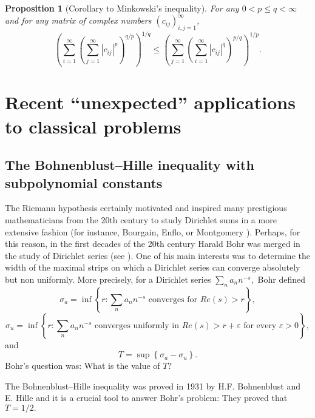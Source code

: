 \documentclass[10pt]{amsart}
\newtheorem{proposition}[theorem]{Proposition}
\numberwithin{equation}{section}
\begin{document}
\begin{proposition}[Corollary to Minkowski's inequality]
\label{8776}For any $0<p\leq q< \infty $ and for any matrix of complex
numbers $(c_{ij})_{i,j=1}^{\infty}$,
\begin{equation*}
\left( \sum_{i=1}^{\infty}\left( \sum_{j=1}^{\infty}|c_{ij}|^{p}\right)
^{q/p}\right) ^{1/q}\leq \left( \sum_{j=1}^{\infty}\left(
\sum_{i=1}^{\infty}|c_{ij}|^{q}\right) ^{p/q}\right) ^{1/p}.
\end{equation*}
\end{proposition}

\section{Recent ``unexpected'' applications to classical problems}

\subsection{The Bohnenblust--Hille inequality with subpolynomial constants}

\label{989}

The Riemann hypothesis certainly motivated and inspired many prestigious
mathematicians from the 20th century to study Dirichlet sums in a more
extensive fashion (for instance, Bourgain, Enflo, or Montgomery \cite{B,E,M}). Perhaps, for this reason, in the first decades of the 20th century Harald
Bohr was merged in the study of Dirichlet series (see \cite{bohr1913,
bohr1914, bohr1914b}). One of his main interests was to determine the width
of the maximal strips on which a Dirichlet series can converge absolutely
but non uniformly. More precisely, for a Dirichlet series $\sum\limits_{n}a_{n}n^{-s},$ Bohr defined
\begin{equation*}
\sigma _{a}=\inf \left\{ r:\sum_{n}a_{n}n^{-s}\text{ converges for }Re(s)>r\right\} ,
\end{equation*}\begin{equation*}
\sigma _{u}=\inf \left\{ r:\sum_{n}a_{n}n^{-s}\text{ converges uniformly in }Re\left( s\right) >r+\varepsilon \text{ for every }\varepsilon >0\right\} ,
\end{equation*}\noindent and
\begin{equation*}
T=\sup \left\{ \sigma _{a}-\sigma _{u}\right\} .
\end{equation*}Bohr's question was: What is the value of $T?$

The Bohnenblust--Hille inequality was proved in 1931 by H.F. Bohnenblust and
E. Hille and it is a crucial tool to answer Bohr's problem: They proved that
$T=1/2.$
\end{document}
